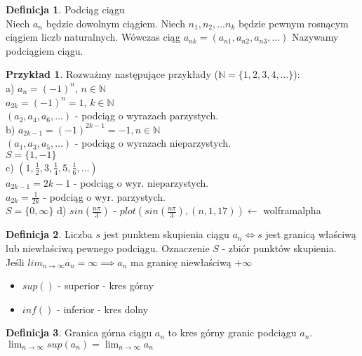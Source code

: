 \documentclass{article}
\theoremstyle{definition}
\newtheorem{de}{Definicja}[subsection]
\theoremstyle{definition}
\theoremstyle{definition}
\newtheorem{pk}{Przykład}[subsection]
\theoremstyle{definition}
\begin{document}
\begin{de}
Podciąg ciągu\\
Niech $a_n$ będzie dowolnym ciągiem. Niech $n_1, n_2, ... n_k$ będzie pewnym rosnącym ciągiem liczb naturalnych.
Wówczas ciąg $a_{nk}=(a_{n1}, a_{n2}, a_{n3}, ...)$ Nazywamy podciągiem ciągu.
\end{de}

\begin{pk}
Rozważmy następujące przykłady ($\mathbb{N}=\{1,2,3,4,\dots\}$):\\
a) $a_n=(-1)^{n}$, $n\in\mathbb{N}$\\
$a_{2k}=(-1)^{n}=1$, $k\in\mathbb{N}$\\
$(a_2, a_4, a_6, ...)$ - podciąg o wyrazach parzystych.\\
b) $a_{2k-1}=(-1)^{2k-1}=-1, n\in\mathbb{N}$\\
$(a_1, a_3, a_5, ...)$ - podciąg o wyrazach nieparzystych.\\
$S=\{1,-1\}$\\
c) $(1, \frac{1}{2}, 3, \frac{1}{4}, 5, \frac{1}{6},\dots)$\\
$a_{2k-1}=2k-1$ - podciąg o wyr. nieparzystych.\\
$a_{2k}=\frac{1}{2k}$ - podciąg o wyr. parzystych.\\
$S=\{0, \infty\}$
d) $sin(\frac{n\pi}{3})$ - $plot(sin(\frac{n\pi}{3}),(n,1,17)) \leftarrow$ wolframalpha
\end{pk}

\begin{de}
Liczba $s$ jest punktem skupienia ciągu $a_n\iff s$ jest granicą właściwą lub niewłaściwą pewnego podciągu.
Oznaczenie $S$ - zbiór punktów skupienia.\\

Jeśli $lim_{n\rightarrow \infty} a_n = \infty \implies a_n$ ma granicę niewłaściwą $+\infty$
\end{de}

\begin{itemize}
\item $sup()$ - superior - kres górny
\item $inf()$ - inferior - kres dolny
\end{itemize}

\begin{de}
Granica górna ciągu $a_n$ to kres górny granic podciągu $a_n$.\\
$\lim_{n\rightarrow \infty} sup(a_n) = \lim_{n\rightarrow\infty} a_n$
\end{de}
\end{document}
